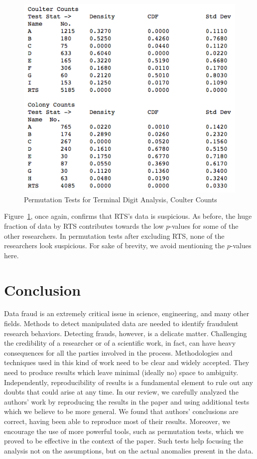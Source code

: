 \documentclass{article}
\begin{document}
\begin{figure}[H]
\centering
\includegraphics[width=0.7\linewidth]{images/raaz_eq_perm_summary.png}
\caption{Permutation Tests for Terminal Digit Analysis, Coulter Counts}
\label{perm2}
\end{figure}

Figure~\ref{perm2}, once again, confirms that RTS's data is suspicious. As before, the huge fraction of data
by RTS contributes towards the low $p$-values for some of the other
researchers. In permutation tests after excluding RTS, none of the researchers look suspicious. For sake of brevity, we avoid mentioning the
$p$-values here.

    \section{Conclusion}\label{conclusion}

    Data fraud is an extremely critical issue in science, engineering, and
many other fields. Methods to detect manipulated data are needed to
identify fraudulent research behaviors. Detecting frauds, however, is a
delicate matter. Challenging the credibility of a researcher or of a
scientific work, in fact, can have heavy consequences for all the parties
involved in the process. Methodologies and techniques used in this kind
of work need to be clear and widely accepted. They need to produce
results which leave minimal (ideally no) space to ambiguity. Independently, reproducibility of results is a fundamental element to rule out any doubts that could arise at any time.
In our review, we carefully analyzed the authors' work by reproducing the results in the paper and using additional tests which we believe to be more general.
We found that authors' conclusions are correct, having been able to reproduce most of their results. 
Moreover, we encourage the use of more powerful tools, such as permutation tests, which we proved to be effective in the context of the paper. 
Such tests help focusing the analysis not on the assumptions, but on the actual anomalies present in the data.
\end{document}
